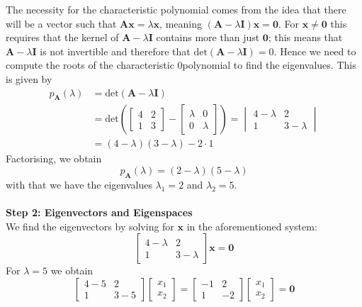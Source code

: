 \documentclass{report}
\begin{document}
The necessity for the characteristic polynomial comes from the idea 
that there will be a vector such that $\bm{Ax}=\lambda\bm{x}$, meaning $(\bm{A}-\lambda\bm{I})\bm{x}=\bm{0}$. For
$\bm{x}\neq\bm{0}$ this requires that the kernel of 
$\bm{A}-\lambda\bm{I}$ contains more than just $\bm{0}$;
this means that $\bm{A}-\lambda\bm{I}$ is not invertible and therefore that $\text{det}(\bm{A}-\lambda\bm{I})=0$.
Hence we need to compute the roots of the characteristic 0polynomial to find the eigenvalues. This is given by
\begin{align*}
p_{\bm{A}}(\lambda)&=\text{det}(\bm{A}-\lambda\bm{I})\\
&=\text{det}\left(\begin{bmatrix}
4&2\\1&3\end{bmatrix}-
\begin{bmatrix}\lambda&0\\0&\lambda\end{bmatrix}\right)
=\begin{vmatrix}4-\lambda&2\\1&3-\lambda\end{vmatrix}\\
&=(4-\lambda)(3-\lambda)-2\cdot1
\end{align*}
Factorising, we obtain
\begin{equation*}
p_{\bm{A}}(\lambda)=(2-\lambda)(5-\lambda)
\end{equation*}
with that we have the eigenvalues $\lambda_1=2$ and $\lambda_2=5$.\\
\vspace{1mm}\\
\textbf{Step 2: Eigenvectors and Eigenspaces}\\
We find the eigenvectors by solving for $\bm{x}$ in the aforementioned system:
\begin{equation*}
\begin{bmatrix}4-\lambda&2\\1&3-\lambda\end{bmatrix}\bm{x}=\bm{0}
\end{equation*}
For $\lambda=5$ we obtain
\begin{equation*}
\begin{bmatrix}4-5&2\\1&3-5\end{bmatrix}
\begin{bmatrix}x_1\\x_2\end{bmatrix}
=\begin{bmatrix}-1&2\\1&-2\end{bmatrix}\begin{bmatrix}x_1\\x_2\end{bmatrix}
=\bm{0}
\end{equation*}
\end{document}
